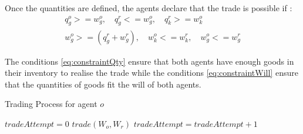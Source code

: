 \documentclass[a4paper]{article}
\begin{document}
Once the quantities are defined, the agents declare that the trade is possible if :
\begin{align}
q_g^o >= w_g^o,\quad q_g^r <= w_g^o,\quad q_k^r >= w_k^o \label{eq:constraintQty}\\
w_g^o>=(q_g^r+w_g^r),\quad w_k^o<=w_k^r,\quad w_g^o<=w_g^r \label{eq:constraintWill}
\end{align}


The conditions \ref{eq:constraintQty} ensure that both agents have enough goods in their inventory to realise the trade while the conditions \ref{eq:constraintWill} ensure that the quantities of goods fit the will of both agents.

\begin{algorithm}
\caption{Trading Process for agent $o$}
\label{algo:trade}
	\begin{algorithmic}[1]
			\State $tradeAttempt = 0$
					\State $trade(W_o,W_r)$
				\Else
					\State $tradeAttempt = tradeAttempt + 1$					
				\EndIf
			\EndFor
		\EndFor
\end{algorithmic}
\end{algorithm}



  
%

\end{document}
